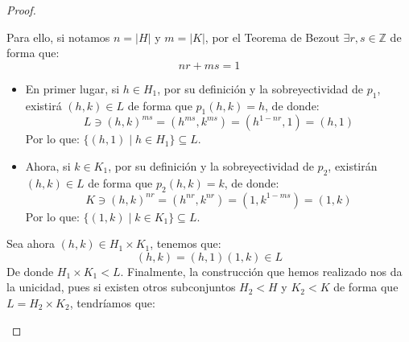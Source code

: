 \begin{teo}
\begin{proof}
\begin{enumerate}
                \begin{figure}[H]
                 \centering   
                \end{figure}
                Para ello, si notamos $n = |H|$ y $m = |K|$, por el Teorema de Bezout $\exists r,s\in \mathbb{Z}$ de forma que:
                \begin{equation*}
                    nr + ms = 1
                \end{equation*}
                \begin{itemize}
                    \item En primer lugar, si $h\in H_1$, por su definición y la sobreyectividad de $p_1$, existirá $(h,k)\in L$ de forma que $p_1(h,k) = h$, de donde:
                        \begin{equation*}
                            L \ni {(h,k)}^{ms} = \left(h^{ms}, k^{ms}\right) = \left(h^{1-nr},1\right) = (h,1)
                        \end{equation*}
                        Por lo que: $\{(h,1)\mid h\in H_1\} \subseteq L$.
                    \item Ahora, si $k\in K_1$, por su definición y la sobreyectividad de $p_2$, existirán $(h,k)\in L$ de forma que $p_2(h,k) = k$, de donde:
                        \begin{equation*}
                            K \ni {(h,k)}^{nr} = \left(h^{nr},k^{nr}\right) = (1, k^{1-ms}) = (1,k)
                        \end{equation*}
                        Por lo que: $\{(1,k)\mid k\in K_1\}\subseteq L$.
                \end{itemize}
                Sea ahora $(h,k)\in H_1\times K_1$, tenemos que:
                \begin{equation*}
                    (h,k) = (h,1)(1,k) \in L
                \end{equation*}
                De donde $H_1\times K_1 < L$. Finalmente, la construcción que hemos realizado nos da la unicidad, pues si existen otros subconjuntos $H_2<H$ y $K_2<K$ de forma que $L = H_2\times K_2$, tendríamos que:

\end{enumerate}
\end{proof}
\end{teo}
